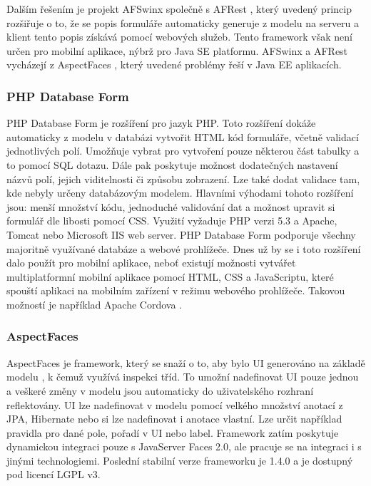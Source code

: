 Dalším řešením je projekt AFSwinx společně s AFRest \cite{tomasek-thesis}, který uvedený princip rozšiřuje o to, že se popis formuláře automaticky generuje z modelu na serveru a klient tento popis získává pomocí webových služeb. Tento framework však není určen pro mobilní aplikace, nýbrž pro Java SE platformu. AFSwinx a AFRest vycházejí z AspectFaces \cite{aspect-faces}, který  uvedené problémy řeší v Java EE aplikacích.

\subsubsection{PHP Database Form}
PHP Database Form \cite{phpdbform} je rozšíření pro jazyk PHP. Toto rozšíření dokáže automaticky z modelu v databázi vytvořit HTML kód formuláře, včetně validací jednotlivých polí. Umožňuje vybrat pro vytvoření pouze některou část tabulky a to pomocí SQL dotazu. Dále pak poskytuje možnost dodatečných nastavení názvů polí, jejich viditelnosti či způsobu zobrazení. Lze také dodat validace tam, kde nebyly určeny databázovým modelem. Hlavními výhodami tohoto rozšíření jsou: menší množství kódu, jednoduché validování dat a možnost upravit si formulář dle libosti pomocí CSS. Využití vyžaduje PHP verzi 5.3 a Apache, Tomcat nebo Microsoft IIS web server. PHP Database Form podporuje všechny majoritně využívané databáze a webové prohlížeče. Dnes už by se i toto rozšíření dalo použít pro mobilní aplikace, neboť existují možnosti vytvářet multiplatformní mobilní aplikace pomocí HTML, CSS a JavaScriptu, které spouští aplikaci na mobilním zařízení v režimu webového prohlížeče. Takovou možností je například Apache Cordova \cite{apache-cordova}.

\subsubsection{AspectFaces}
AspectFaces je framework, který se snaží o to, aby bylo UI generováno na základě modelu \cite{aspectdriven}, k čemuž využívá inspekci tříd. To umožní nadefinovat UI pouze jednou a veškeré změny v modelu jsou automaticky do uživatelského rozhraní reflektovány. UI lze nadefinovat v modelu pomocí velkého množství anotací z JPA, Hibernate nebo si lze nadefinovat i anotace vlastní. Lze určit například pravidla pro dané pole, pořadí v UI nebo label. Framework zatím poskytuje dynamickou integraci pouze s JavaServer Faces 2.0, ale pracuje se na integraci i s jinými technologiemi. Poslední stabilní verze frameworku je 1.4.0 a je dostupný pod licencí LGPL v3.


